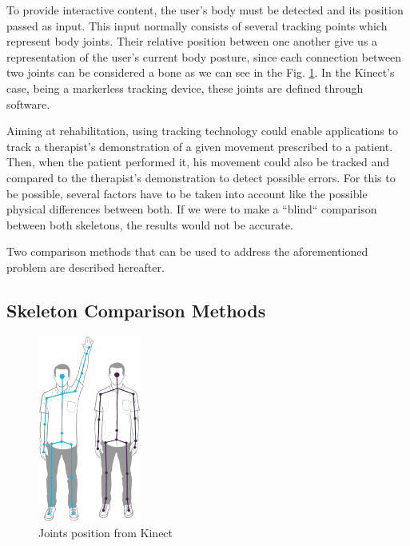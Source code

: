 To provide interactive content, the user's body must be detected and its position passed as input. This input normally consists of several tracking points which represent body joints. Their relative position between one another give us a representation of the user's current body posture, since each connection between two joints can be considered a bone as we can see in the 
Fig. \ref{fig:joints}.
In the Kinect's case, being a markerless tracking device, these joints are defined through software.


Aiming at rehabilitation, using tracking technology could enable applications to track a therapist's demonstration of a given movement prescribed to a patient.
Then, when the patient performed it, his movement could also be tracked and compared to the therapist's demonstration to detect possible errors.
For this to be possible, several factors have to be taken into account like the possible physical differences between both. If we were to make a ``blind`` comparison between both skeletons, the results would not be accurate.

Two comparison methods that can be used to address the aforementioned problem are described hereafter.


\subsection{Skeleton Comparison Methods}
\label{sec:skeletoncomparison}

\begin{figure}[!t]
    \begin{center}
        \includegraphics[width=0.3\textwidth]{imgs/joints}
    \end{center}
    \caption{Joints position from Kinect}
	\label{fig:joints}
\end{figure}

